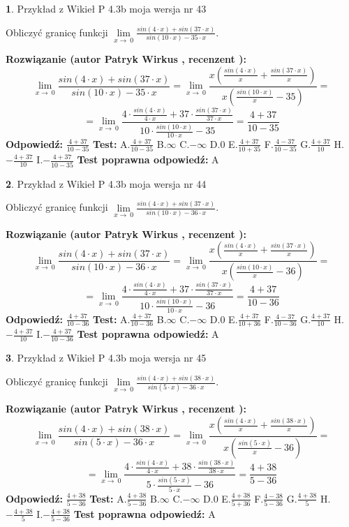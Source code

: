 \documentclass[12pt, a4paper]{article}
\theoremstyle{definition} %
\newtheorem{zad}{}
\newcommand{\zadStart}[1]{\begin{zad}#1\newline}
\newcommand{\zadStop}{\end{zad}}
\newcommand{\rozwStart}[2]{\noindent \textbf{Rozwiązanie (autor #1 , recenzent #2): }\newline}
\newcommand{\rozwStop}{\newline}
\newcommand{\odpStart}{\noindent \textbf{Odpowiedź:}\newline}
\newcommand{\odpStop}{\newline}
\newcommand{\testStart}{\noindent \textbf{Test:}\newline}
\newcommand{\testStop}{\newline}
\newcommand{\kluczStart}{\noindent \textbf{Test poprawna odpowiedź:}\newline}
\newcommand{\kluczStop}{\newline}
\begin{document}
\zadStart{Przykład z Wikieł P 4.3b moja wersja nr 43}


Obliczyć granicę funkcji $\lim\limits_{x\to\ 0}\frac{sin(4 \cdot x)+sin(37 \cdot x)}{sin(10 \cdot x)-35 \cdot x}$.
\zadStop
\rozwStart{Patryk Wirkus}{}
$$\lim\limits_{x\to\ 0}\frac{sin(4 \cdot x)+sin(37 \cdot x)}{sin(10 \cdot x)-35 \cdot x}=\lim\limits_{x\to\ 0}\frac{x(\frac{sin(4 \cdot x)}{x}+\frac{sin(37 \cdot x)}{x})}{x(\frac{sin(10 \cdot x)}{x}-35)}=$$
$$=\lim\limits_{x\to\ 0}\frac{4 \cdot \frac{sin(4 \cdot x)}{4 \cdot x}+37 \cdot \frac{sin(37 \cdot x)}{37 \cdot x}}{10 \cdot \frac{sin(10 \cdot x)}{10 \cdot x}-35}=\frac{4+37}{10-35}$$
\rozwStop
\odpStart
$\frac{4+37}{10-35}$
\odpStop
\testStart
A.$\frac{4+37}{10-35}$
B.$\infty$
C.$-\infty$
D.$0$
E.$\frac{4+37}{10+35}$
F.$\frac{4-37}{10-35}$
G.$\frac{4+37}{10}$
H.$-\frac{4+37}{10}$
I.$-\frac{4+37}{10-35}$
\testStop
\kluczStart
A
\kluczStop



\zadStart{Przykład z Wikieł P 4.3b moja wersja nr 44}


Obliczyć granicę funkcji $\lim\limits_{x\to\ 0}\frac{sin(4 \cdot x)+sin(37 \cdot x)}{sin(10 \cdot x)-36 \cdot x}$.
\zadStop
\rozwStart{Patryk Wirkus}{}
$$\lim\limits_{x\to\ 0}\frac{sin(4 \cdot x)+sin(37 \cdot x)}{sin(10 \cdot x)-36 \cdot x}=\lim\limits_{x\to\ 0}\frac{x(\frac{sin(4 \cdot x)}{x}+\frac{sin(37 \cdot x)}{x})}{x(\frac{sin(10 \cdot x)}{x}-36)}=$$
$$=\lim\limits_{x\to\ 0}\frac{4 \cdot \frac{sin(4 \cdot x)}{4 \cdot x}+37 \cdot \frac{sin(37 \cdot x)}{37 \cdot x}}{10 \cdot \frac{sin(10 \cdot x)}{10 \cdot x}-36}=\frac{4+37}{10-36}$$
\rozwStop
\odpStart
$\frac{4+37}{10-36}$
\odpStop
\testStart
A.$\frac{4+37}{10-36}$
B.$\infty$
C.$-\infty$
D.$0$
E.$\frac{4+37}{10+36}$
F.$\frac{4-37}{10-36}$
G.$\frac{4+37}{10}$
H.$-\frac{4+37}{10}$
I.$-\frac{4+37}{10-36}$
\testStop
\kluczStart
A
\kluczStop



\zadStart{Przykład z Wikieł P 4.3b moja wersja nr 45}


Obliczyć granicę funkcji $\lim\limits_{x\to\ 0}\frac{sin(4 \cdot x)+sin(38 \cdot x)}{sin(5 \cdot x)-36 \cdot x}$.
\zadStop
\rozwStart{Patryk Wirkus}{}
$$\lim\limits_{x\to\ 0}\frac{sin(4 \cdot x)+sin(38 \cdot x)}{sin(5 \cdot x)-36 \cdot x}=\lim\limits_{x\to\ 0}\frac{x(\frac{sin(4 \cdot x)}{x}+\frac{sin(38 \cdot x)}{x})}{x(\frac{sin(5 \cdot x)}{x}-36)}=$$
$$=\lim\limits_{x\to\ 0}\frac{4 \cdot \frac{sin(4 \cdot x)}{4 \cdot x}+38 \cdot \frac{sin(38 \cdot x)}{38 \cdot x}}{5 \cdot \frac{sin(5 \cdot x)}{5 \cdot x}-36}=\frac{4+38}{5-36}$$
\rozwStop
\odpStart
$\frac{4+38}{5-36}$
\odpStop
\testStart
A.$\frac{4+38}{5-36}$
B.$\infty$
C.$-\infty$
D.$0$
E.$\frac{4+38}{5+36}$
F.$\frac{4-38}{5-36}$
G.$\frac{4+38}{5}$
H.$-\frac{4+38}{5}$
I.$-\frac{4+38}{5-36}$
\testStop
\kluczStart
A
\kluczStop
\end{document}
